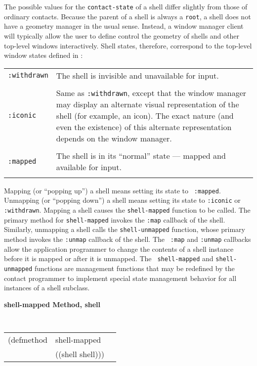 The possible values for the {\tt contact-state} of a shell
differ slightly from those of ordinary contacts. Because the parent of a
shell is always a {\tt root}, a shell does not have a geometry manager
in the usual sense. Instead, a window manager client will typically allow the  user to define control the geometry
of shells and other top-level windows interactively. Shell states,
therefore, correspond to the top-level window states defined in
\cite{icccm}:

\begin{center}
\begin{tabular}{lp{3.5in}}
{\tt :withdrawn} & The shell is invisible and unavailable for input.\\
\\ 
{\tt :iconic} & Same as {\tt :withdrawn}, except that the window manager
may display an alternate visual representation of the shell (for
example, an icon). The exact nature (and even the existence) of this
alternate representation depends on the window manager.\\
\\ {\tt :mapped} & The shell is in its ``normal'' state --- mapped and
available for input.\\ \\ 
\end{tabular} \end{center}


Mapping (or ``popping up'') a shell means setting its state to {\tt
:mapped}.
Unmapping (or ``popping down'') a shell means setting its state to {\tt :iconic} or {\tt
:withdrawn}.  Mapping a shell causes the {\tt shell-mapped} function to be called.
The primary method for {\tt shell-mapped} invokes the {\tt :map} callback of the
shell.  Similarly, unmapping a shell calls the {\tt shell-unmapped} function,
whose primary method invokes the {\tt :unmap} callback of the shell.  The {\tt
:map} and {\tt :unmap} callbacks allow the application programmer to change the
contents of a shell instance before it is mapped or after it is unmapped. The {\tt
shell-mapped} and {\tt shell-unmapped} functions are management functions that may
be redefined by the contact programmer  to implement special state management
behavior for all instances of a shell subclass.

{\samepage
{\large {\bf shell-mapped \hfill Method, shell}}
\begin{flushright} \parbox[t]{6.125in}{
\tt
\begin{tabular}{lll}
\raggedright
(defmethod & shell-mapped & \\
           & ((shell  shell)))
\end{tabular}
\rm

}\end{flushright}}

